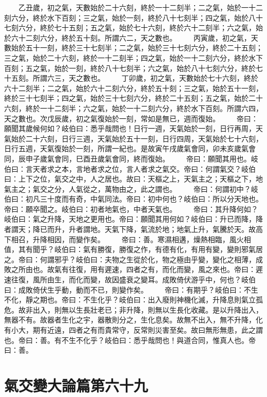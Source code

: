 　　乙丑歲，初之氣，天數始於二十六刻，終於一十二刻半；二之氣，始於一十二刻六分，終於水下百刻；三之氣，始於一刻，終於八十七刻半；四之氣，始於八十七刻六分，終於七十五刻；五之氣，始於七十六刻，終於六十二刻半；六之氣，始於六十二刻六分，終於五十刻。所謂六二，天之數也。
　　丙寅歲，初之氣，天數始於五十一刻，終於三十七刻半；二之氣，始於三十七刻六分，終於二十五刻；三之氣，始於二十六刻，終於一十二刻半；四之氣，始於一十二刻六分，終於水下百刻；五之氣，始於一刻，終於八十七刻半；六之氣，始於八十七刻六分，終於七十五刻。所謂六三，天之數也。
　　丁卯歲，初之氣，天數始於七十六刻，終於六十二刻半；二之氣，始於六十二刻六分，終於五十刻；三之氣，始於五十一刻，終於三十七刻半；四之氣，始於三十七刻六分，終於二十五刻；五之氣，始於二十六刻，終於一十二刻半；六之氣，始於一十二刻六分，終於水下百刻。所謂六四，天之數也。次戊辰歲，初之氣復始於一刻，常如是無已，週而復始。
　　帝曰：願聞其歲候何如？岐伯曰：悉乎哉問也！日行一週，天氣始於一刻，日行再周，天氣始於二十六刻，日行三週，天氣始於五十一刻，日行四周，天氣始於七十六刻，日行五週，天氣復始於一刻，所謂一紀也。是故寅午戌歲氣會同，卯未亥歲氣會同，辰申子歲氣會同，巳酉丑歲氣會同，終而復始。
　　帝曰：願聞其用也。岐伯曰：言天者求之本，言地者求之位，言人者求之氣交。帝曰：何謂氣交？岐伯曰：上下之位，氣交之中，人之居也。故曰：天樞之上，天氣主之；天樞之下，地氣主之；氣交之分，人氣從之，萬物由之，此之謂也。
　　帝曰：何謂初中？岐伯曰：初凡三十度而有奇，中氣同法。帝曰：初中何也？岐伯曰：所以分天地也。帝曰：願卒聞之。岐伯曰：初者地氣也，中者天氣也。
　　帝曰：其升降何如？岐伯曰：氣之升降，天地之更用也。帝曰：願聞其用何如？岐伯曰：升已而降，降者謂天；降已而升，升者謂地。天氣下降，氣流於地；地氣上升，氣騰於天。故高下相召，升降相因，而變作矣。
　　帝曰：善。寒濕相遘，燥熱相臨，風火相值，其有聞乎？岐伯曰：氣有勝復，勝復之作，有德有化，有用有變，變則邪氣居之。帝曰：何謂邪乎？岐伯曰：夫物之生從於化，物之極由乎變，變化之相薄，成敗之所由也。故氣有往復，用有遲速，四者之有，而化而變，風之來也。帝曰：遲速往復，風所由生，而化而變，故因盛衰之變耳。成敗倚伏游乎中，何也？岐伯曰：成敗倚伏生乎動，動而不已，則變作矣。
　　帝曰：有期乎？岐伯曰：不生不化，靜之期也。帝曰：不生化乎？岐伯曰：出入廢則神機化滅，升降息則氣立孤危。故非出入，則無以生長壯老已；非升降，則無以生長化收藏。是以升降出入，無器不有。故器者生化之宇，器散則分之，生化息矣。故無不出入，無不升降，化有小大，期有近遠，四者之有而貴常守，反常則災害至矣。故曰無形無患，此之謂也。帝曰：善。有不生不化乎？岐伯曰：悉乎哉問也！與道合同，惟真人也。帝曰：善。

\section{氣交變大論篇第六十九}

